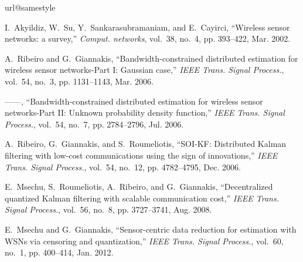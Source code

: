 \documentclass[journal]{IEEEtran}
\begin{document}
\begin{thebibliography}{10}
\providecommand{\url}[1]{#1}
\csname url@samestyle\endcsname
\providecommand{\newblock}{\relax}
\providecommand{\bibinfo}[2]{#2}
\providecommand{\BIBentrySTDinterwordspacing}{\spaceskip=0pt\relax}
\providecommand{\BIBentryALTinterwordstretchfactor}{4}
\providecommand{\BIBentryALTinterwordspacing}{\spaceskip=\fontdimen2\font plus
\BIBentryALTinterwordstretchfactor\fontdimen3\font minus
  \fontdimen4\font\relax}
\providecommand{\BIBforeignlanguage}[2]{{\expandafter\ifx\csname l@#1\endcsname\relax
\typeout{** WARNING: IEEEtran.bst: No hyphenation pattern has been}\typeout{** loaded for the language `#1'. Using the pattern for}\typeout{** the default language instead.}\else
\language=\csname l@#1\endcsname
\fi
#2}}
\providecommand{\BIBdecl}{\relax}
\BIBdecl


I.~Akyildiz, W.~Su, Y.~Sankarasubramaniam, and E.~Cayirci, ``Wireless sensor
  networks: a survey,'' \emph{Comput. networks}, vol.~38, no.~4, pp. 393--422, Mar.
  2002.

A.~Ribeiro and G.~Giannakis, ``Bandwidth-constrained distributed estimation
  for wireless sensor networks-Part I: Gaussian case,'' \emph{IEEE Trans. Signal Process.},
   vol.~54, no.~3, pp. 1131--1143, Mar. 2006.

------, ``Bandwidth-constrained distributed estimation for wireless sensor
  networks-Part II: Unknown probability density function,'' \emph{IEEE Trans. Signal Process.},
   vol.~54, no.~7, pp. 2784--2796, Jul. 2006.

A.~Ribeiro, G.~Giannakis, and S.~Roumeliotis, ``SOI-KF: Distributed Kalman filtering with low-cost communications using the sign of innovations,''
 \emph{IEEE Trans. Signal Process.}, vol.~54, no.~12, pp.
  4782--4795, Dec. 2006.

E.~Msechu, S.~Roumeliotis, A.~Ribeiro, and G.~Giannakis,
  ``Decentralized quantized Kalman filtering with scalable communication
  cost,'' \emph{IEEE Trans. Signal Process.}, vol.~56, no.~8, pp.
  3727--3741, Aug. 2008.

E.~Msechu and G.~Giannakis, ``Sensor-centric data reduction for
  estimation with WSNs via censoring and quantization,'' \emph{IEEE Trans. Signal Process.},
   vol.~60, no.~1, pp. 400--414, Jan. 2012.
{}


\end{thebibliography}
\end{document}
